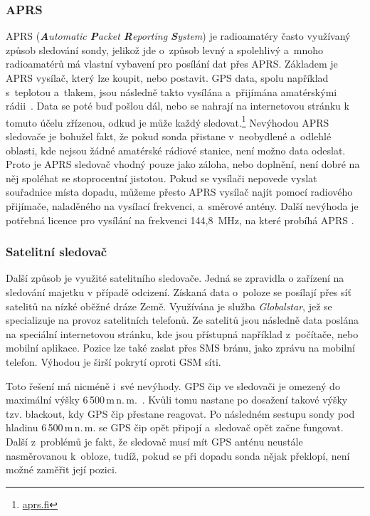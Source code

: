 \documentclass[twoside]{ctuthesis}
\theoremstyle{plain}
\theoremstyle{definition}
\theoremstyle{note}
\begin{document}
				\subsubsection{APRS}
				APRS (\textit{\textbf{A}utomatic \textbf{P}acket \textbf{R}eporting \textbf{S}ystem}) je radioamatéry často využívaný způsob sledování sondy, jelikož jde o~způsob levný a spolehlivý a~mnoho radioamatérů má vlastní vybavení pro posílání dat přes APRS. Základem je APRS vysílač, který lze koupit, nebo postavit. GPS data, spolu například s~teplotou a~tlakem, jsou následně takto vysílána a~přijímána amatérskými rádii~\cite{web_sledovani}. Data se poté buď pošlou dál, nebo se nahrají na internetovou stránku k tomuto účelu zřízenou, odkud je může každý sledovat.\footnote{\url{aprs.fi}}
				Nevýhodou APRS sledovače je bohužel fakt, že pokud sonda přistane v~neobydlené a~odlehlé oblasti, kde nejsou žádné amatérské rádiové stanice, není možno data odeslat. Proto je APRS sledovač vhodný pouze jako záloha, nebo doplnění, není dobré na něj spoléhat se stoprocentní jistotou. Pokud se vysílači nepovede vyslat souřadnice místa dopadu, můžeme přesto APRS vysílač najít pomocí radiového přijímače, naladěného na vysílací frekvenci, a~směrové antény. Další nevýhoda je potřebná licence pro vysílání na frekvenci 144,8~MHz, na které probíhá APRS \cite{web_ctu}.


				\subsubsection{Satelitní sledovač}
				Další způsob je využité satelitního sledovače. Jedná se zpravidla o zařízení na sledování majetku v případě odcizení. Získaná data o~poloze se posílají přes síť satelitů na nízké oběžné dráze Země. Využívána je služba \textit{Globalstar}, jež se specializuje na provoz satelitních telefonů. Ze satelitů jsou následně data poslána na speciální internetovou stránku, kde jsou přístupná například z~počítače, nebo mobilní aplikace. Pozice lze také zaslat přes SMS bránu, jako zprávu na mobilní telefon. Výhodou je širší pokrytí oproti GSM síti. 

				Toto řešení má nicméně i~své nevýhody. GPS čip ve sledovači je omezený do maximální výšky 6\,500\,m\,n.\,m.~\cite{web_spot}. Kvůli tomu nastane po dosažení takové výšky tzv. blackout, kdy GPS čip přestane reagovat. Po následném sestupu sondy pod hladinu 6\,500\,m\,n.\,m. se GPS čip opět připojí a~sledovač opět začne fungovat. Další z~problémů je fakt, že sledovač musí mít GPS anténu neustále nasměrovanou k~obloze, tudíž, pokud se při dopadu sonda nějak překlopí, není možné zaměřit její pozici.
\end{document}
